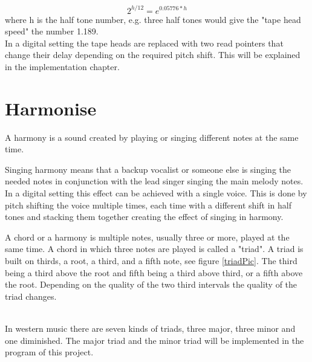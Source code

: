 \[ 2^{h/12} = e^{0.05776*h} \] where h is the half tone number, e.g. three half tones would give the "tape head speed" the number 1.189. \\

In a digital setting the tape heads are replaced with two read pointers that change their delay depending on the required pitch shift. This will be explained in the implementation chapter.

\section{Harmonise}

A harmony is a sound created by playing or singing different notes at the same time\citep{Harmonise02}.

Singing harmony means that a backup vocalist or someone else is singing the needed notes in conjunction with the lead singer singing the main melody notes. In a digital setting this effect can be achieved with a single voice. This is done by pitch shifting the voice multiple times, each time with a different shift in half tones and stacking them together creating the effect of singing in harmony. 

A chord or a harmony is multiple notes, usually three or more, played at the same time. A chord in which three notes are played is called a "triad"\citep{Harmonise01}. A triad is built on thirds, a root, a third, and a fifth note, see figure \ref{triadPic}. The third being a third above the root and fifth being a third above third, or a fifth above the root. Depending on the quality of the two third intervals the quality of the triad changes. \\

\begin{minipage}{\linewidth}%
\label{triadPic}
\end{minipage}\\

In western music there are seven kinds of triads, three major, three minor and one diminished. The major triad and the minor triad will be implemented in the program of this project.